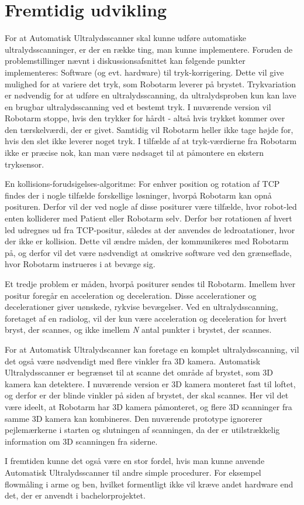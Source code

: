 \chapter{Fremtidig udvikling}\label{kapitel_Fremtidig udvikling}
For at Automatisk Ultralydsscanner skal kunne udføre automatiske ultralydsscanninger, er der en række ting, man kunne implementere. Foruden de problemstillinger nævnt i diskussionsafsnittet kan følgende punkter implementeres:
Software (og evt. hardware) til tryk-korrigering. Dette vil give mulighed for at variere det tryk, som Robotarm leverer på brystet. Trykvariation er nødvendig for at udføre en ultralydsscanning, da ultralydsproben kun kan lave en brugbar ultralydsscanning ved et bestemt tryk. I nuværende version vil Robotarm stoppe, hvis den trykker for hårdt - altså hvis trykket kommer over den tærskelværdi, der er givet. Samtidig vil Robotarm heller ikke tage højde for, hvis den slet ikke leverer noget tryk. I tilfælde af at tryk-værdierne fra Robotarm ikke er præcise nok, kan man være nødsaget til at påmontere en ekstern tryksensor.

En kollisions-forudsigelses-algoritme: For enhver position og rotation af TCP findes der i nogle tilfælde forskellige løsninger, hvorpå Robotarm kan opnå posituren. Derfor vil der ved nogle af disse positurer være tilfælde, hvor robot-led enten kolliderer med Patient eller Robotarm selv. Derfor bør rotationen af hvert led udregnes ud fra TCP-positur, således at der anvendes de ledroatationer, hvor der ikke er kollision. Dette vil ændre måden, der kommunikeres med Robotarm på, og derfor vil det være nødvendigt at omskrive software ved den grænseflade, hvor Robotarm instrueres i at bevæge sig.

Et tredje problem er måden, hvorpå positurer sendes til Robotarm. Imellem hver positur foregår en acceleration og deceleration. Disse accelerationer og decelerationer giver uønskede, rykvise bevægelser. Ved en ultralydsscanning, foretaget af en radiolog, vil der kun være acceleration og deceleration for hvert bryst, der scannes, og ikke imellem \textit{N} antal punkter i brystet, der scannes.

For at Automatisk Ultralydscanner kan foretage en komplet ultralydsscanning, vil det også være nødvendigt med flere vinkler fra 3D kamera. Automatisk Ultralydsscanner er begrænset til at scanne det område af brystet, som 3D kamera kan detektere. I nuværende version er 3D kamera monteret fast til loftet, og derfor er der blinde vinkler på siden af brystet, der skal scannes. Her vil det være ideelt, at Robotarm har 3D kamera påmonteret, og flere 3D scanninger fra samme 3D kamera kan kombineres. Den nuværende prototype ignorerer pejlemærkerne i starten og slutningen af scanningen, da der er utilstrækkelig information om 3D scanningen fra siderne.

I fremtiden kunne det også være en stor fordel, hvis man kunne anvende Automatisk Ultralydsscanner til andre simple procedurer. For eksempel flowmåling i arme og ben, hvilket formentligt ikke vil kræve andet hardware end det, der er anvendt i bachelorprojektet.